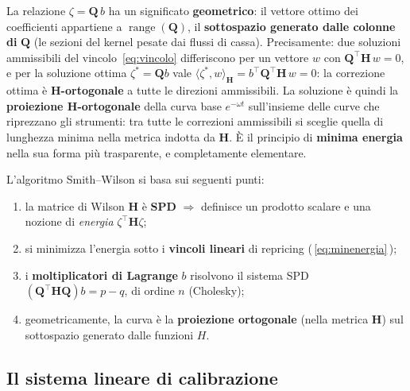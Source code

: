 \documentclass[11pt,a4paper]{article}
\theoremstyle{plain}
\theoremstyle{definition}
\theoremstyle{remark}
\newcommand{\Qmat}{\mathbf{Q}}
\newcommand{\Hmat}{\mathbf{H}}
\newcommand{\transp}{^{\!\top}}
\begin{document}
La relazione $\zeta = \Qmat\,b$ ha un significato \textbf{geometrico}: il vettore ottimo dei
coefficienti appartiene a $\operatorname{range}(\Qmat)$, il \textbf{sottospazio generato
dalle colonne di} $\Qmat$ (le sezioni del kernel pesate dai flussi di cassa). Precisamente:
due soluzioni ammissibili del vincolo~\eqref{eq:vincolo} differiscono per un vettore $w$ con
$\Qmat\transp\Hmat\,w = 0$, e per la soluzione ottima $\zeta^\ast=\Qmat b$ vale
$\langle \zeta^\ast, w\rangle_{\Hmat} = b\transp\Qmat\transp\Hmat\,w = 0$: la correzione
ottima \`e \textbf{$\Hmat$-ortogonale} a tutte le direzioni ammissibili. La soluzione \`e
quindi la \textbf{proiezione $\Hmat$-ortogonale} della curva base $e^{-\omega t}$
sull'insieme delle curve che riprezzano gli strumenti: tra tutte le correzioni ammissibili
si sceglie quella di lunghezza minima nella metrica indotta da $\Hmat$. \`E il principio di
\textbf{minima energia} nella sua forma pi\`u trasparente, e completamente elementare.

\begin{keybox}
L'algoritmo Smith--Wilson si basa sui seguenti punti:
\begin{enumerate}
  \item la matrice di Wilson $\Hmat$ \`e \textbf{SPD} $\Rightarrow$ definisce un prodotto
        scalare e una nozione di \emph{energia} $\zeta\transp\Hmat\zeta$;
  \item si minimizza l'energia sotto i \textbf{vincoli lineari} di repricing
        (\,\eqref{eq:minenergia}\,);
  \item i \textbf{moltiplicatori di Lagrange} $b$ risolvono il sistema SPD
        $(\Qmat\transp\Hmat\Qmat)b = p-q$, di ordine $n$ (Cholesky);
  \item geometricamente, la curva \`e la \textbf{proiezione ortogonale} (nella metrica
        $\Hmat$) sul sottospazio generato dalle funzioni $H$.
\end{enumerate}
\end{keybox}

\subsection{Il sistema lineare di calibrazione}
\end{document}
